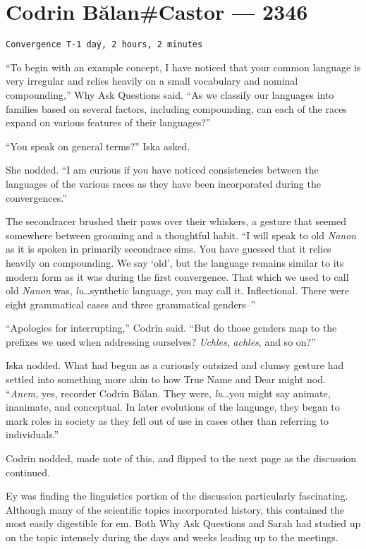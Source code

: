 \hypertarget{codrin-bux103lancastor-2346}{%
\chapter{Codrin Bălan\#Castor — 2346}\label{codrin-bux103lancastor-2346}}

\begin{verbatim}
Convergence T-1 day, 2 hours, 2 minutes
\end{verbatim}

``To begin with an example concept, I have noticed that your common language is very irregular and relies heavily on a small vocabulary and nominal compounding,'' Why Ask Questions said. ``As we classify our languages into families based on several factors, including compounding, can each of the races expand on various features of their languages?''

``You speak on general terms?'' Iska asked.

She nodded. ``I am curious if you have noticed consistencies between the languages of the various races as they have been incorporated during the convergences.''

The secondracer brushed their paws over their whiskers, a gesture that seemed somewhere between grooming and a thoughtful habit. ``I will speak to old \emph{Nanon} as it is spoken in primarily secondrace sims. You have guessed that it relies heavily on compounding. We say `old', but the language remains similar to its modern form as it was during the first convergence. That which we used to call old \emph{Nanon} was, \emph{lu}\ldots synthetic language, you may call it. Inflectional. There were eight grammatical cases and three grammatical genders--''

``Apologies for interrupting,'' Codrin said. ``But do those genders map to the prefixes we used when addressing ourselves? \emph{Uchles}, \emph{achles}, and so on?''

Iska nodded. What had begun as a curiously outsized and clumsy gesture had settled into something more akin to how True Name and Dear might nod. ``\emph{Anem,} yes, recorder Codrin Bălan. They were, \emph{lu}\ldots you might say animate, inanimate, and conceptual. In later evolutions of the language, they began to mark roles in society as they fell out of use in cases other than referring to individuals.''

Codrin nodded, made note of this, and flipped to the next page as the discussion continued.

Ey was finding the linguistics portion of the discussion particularly fascinating. Although many of the scientific topics incorporated history, this contained the most easily digestible for em. Both Why Ask Questions and Sarah had studied up on the topic intensely during the days and weeks leading up to the meetings.

